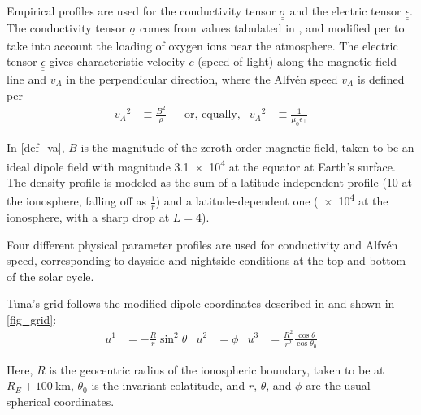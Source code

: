 \documentclass{article}
\newcommand{\Alfven}{Alfv\'en\xspace}
\newcommand{\lysakx}{\ensuremath{u^1}\xspace}
\newcommand{\lysaky}{\ensuremath{u^2}\xspace}
\newcommand{\lysakz}{\ensuremath{u^3}\xspace}
\newcommand{\tensor}[1]{\ensuremath{\underline{\underline{#1}}}}
\newcommand{\va}{\ensuremath{v_A}\xspace}
\newcommand{\ep}{\ensuremath{\epsilon_\bot}\xspace}
\newcommand{\mz}{\ensuremath{\mu_0}\xspace}
\begin{document}

Empirical profiles are used for the conductivity tensor $\tensor{\sigma}$ and the electric tensor $\tensor{\epsilon}$. The conductivity tensor $\tensor{\sigma}$ comes from values tabulated in \cite{kelley_1989}, and modified per \cite{lysak_2013} to take into account the loading of oxygen ions near the atmosphere. The electric tensor $\tensor{\epsilon}$ gives characteristic velocity $c$ (speed of light) along the magnetic field line and $\va$ in the perpendicular direction, where the \Alfven speed $\va$ is defined per
\begin{align}
    \label{def_va}
    \va^2 &\equiv \frac{B^2}{\rho} &
    & \text{or, equally,} &
    \va^2 &\equiv \frac{1}{\mz\ep}
\end{align}

In \cref{def_va}, $B$ is the magnitude of the zeroth-order magnetic field, taken to be an ideal dipole field with magnitude \SI{3.1e4}{\nT} at the equator at Earth's surface. The density profile is modeled as the sum of a latitude-independent profile (\SI{10}{\percc} at the ionosphere, falling off as $\frac{1}{r}$) and a latitude-dependent one (\SI{e4}{\percc} at the ionosphere, with a sharp drop at $L = 4$).

Four different physical parameter profiles are used for conductivity and \Alfven speed, corresponding to dayside and nightside conditions at the top and bottom of the solar cycle.


Tuna's grid follows the modified dipole coordinates described in \cite{lysak_2004} and shown in \cref{fig_grid}:
\begin{align}
  \label{def_coords}
  \lysakx & = - \frac{R}{r} \sin^2 \theta &
  \lysaky & = \phi &
  \lysakz & = \frac{R^2}{r^2} \frac{\cos \theta}{\cos \theta_0}
\end{align}

Here, $R$ is the geocentric radius of the ionospheric boundary, taken to be at $R_E + \SI{100}{\km}$, $\theta_0$ is the invariant colatitude, and $r$, $\theta$, and $\phi$ are the usual spherical coordinates.
\end{document}
